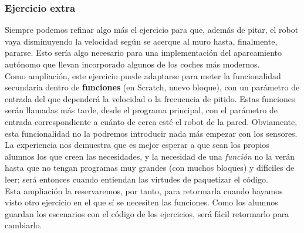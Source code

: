 \subsubsection{Ejercicio extra}
Siempre podemos refinar algo más el ejercicio para que, además de pitar, el robot vaya disminuyendo la velocidad según se acerque al muro hasta, finalmente, pararse. Esto sería algo necesario para una implementación del aparcamiento autónomo que llevan incorporado algunos de los coches más modernos.\\
Como ampliación, este ejercicio puede adaptarse para meter la funcionalidad secundaria dentro de \textbf{funciones} (en Scratch, nuevo bloque), con un parámetro de entrada del que dependerá la velocidad o la frecuencia de pitido. Estas funciones serán llamadas más tarde, desde el programa principal, con el parámetro de entrada correspondiente a cuánto de cerca esté el robot de la pared. Obviamente, esta funcionalidad no la podremos introducir nada más empezar con los sensores. La experiencia nos demuestra que es mejor esperar a que sean los propios alumnos los que creen las necesidades, y la necesidad de una \textit{función} no la verán hasta que no tengan programas muy grandes (con muchos bloques) y difíciles de leer; será entonces cuando entiendan las virtudes de paquetizar el código.\\
Esta ampliación la reservaremos, por tanto, para retormarla cuando hayamos visto otro ejercicio en el que sí se necesiten las funciones. Como los alumnos guardan los escenarios con el código de los ejercicios, será fácil retormarlo para cambiarlo.

